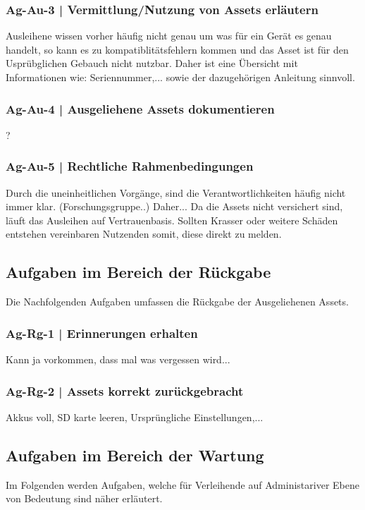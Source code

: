 \subsubsection{Ag-Au-3 | Vermittlung/Nutzung von Assets erläutern}
Ausleihene wissen vorher häufig nicht genau um was für ein Gerät es genau handelt, so kann es zu
kompatiblitätsfehlern kommen und das Asset ist für den Usprübglichen Gebauch nicht nutzbar. Daher
ist eine Übersicht mit Informationen wie: Seriennummer,... sowie der dazugehörigen Anleitung
sinnvoll.
\subsubsection{Ag-Au-4 | Ausgeliehene Assets dokumentieren}
?
\subsubsection{Ag-Au-5 | Rechtliche Rahmenbedingungen}
Durch die uneinheitlichen Vorgänge, sind die Verantwortlichkeiten häufig nicht immer klar.
(Forschungsgruppe..) Daher... Da die Assets nicht versichert sind, läuft das Ausleihen auf
Vertrauenbasis. Sollten Krasser oder weitere Schäden entstehen vereinbaren Nutzenden somit, diese
direkt zu melden.

\subsection{Aufgaben im Bereich der Rückgabe}
Die Nachfolgenden Aufgaben umfassen die Rückgabe der Ausgeliehenen Assets.

\subsubsection{Ag-Rg-1 | Erinnerungen erhalten}
Kann ja vorkommen, dass mal was vergessen wird...
\subsubsection{Ag-Rg-2 | Assets korrekt zurückgebracht}
Akkus voll, SD karte leeren, Ursprüngliche Einstellungen,...

\subsection{Aufgaben im Bereich der Wartung}
\label{subsec:wartung}
Im Folgenden werden Aufgaben, welche für Verleihende auf Administariver Ebene von Bedeutung sind
näher erläutert. 

